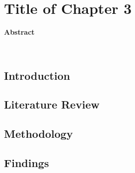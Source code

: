 \chapter{Title of Chapter 3} \label{cha:ch2}
\vspace{1cm}


\therule
\centerline{\textbf{Abstract}} \\
 \par
\therule

\section{Introduction} \label{sec:ch3_introduction}
    

\section{Literature Review} \label{sec:ch3_literature}
    

\section{Methodology} \label{sec:ch3_methodology}
    
    
    
    

\section{Findings} \label{sec:ch3_findings}
    
    

